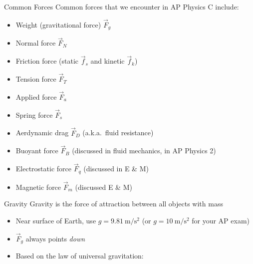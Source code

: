 \documentclass[12pt,compress,aspectratio=169]{beamer}
\begin{document}
\begin{frame}{Common Forces}
  Common forces that we encounter in AP Physics C include:
  \begin{itemize}
  \item Weight (gravitational force) $\vec F_g$
  \item Normal force $\vec F_N$
  \item Friction force (static $\vec f_s$ and kinetic $\vec f_k$)
  \item Tension force $\vec F_T$
  \item Applied force $\vec F_a$
  \item Spring force $\vec F_s$
  \item Aerdynamic drag $\vec F_D$ (a.k.a.\ fluid resistance)
  \item Buoyant force $\vec F_B$ (discussed in fluid mechanics, in AP Physics 2)
  \item Electrostatic force $\vec F_q$ (discussed in E \& M)
  \item Magnetic force $\vec F_m$ (discussed E \& M)
  \end{itemize}
\end{frame}



\begin{frame}{Gravity}
  Gravity is the force of attraction between all objects with mass
    
  \begin{itemize}
  \item Near surface of Earth, use $g=\SI{9.81}{\metre\per\second\squared}$ (or
    $g=\SI{10}{\metre\per\second\squared}$ for your AP exam)
  \item $\vec F_g$ always points \emph{down}
  \item Based on the law of universal gravitation:

  \end{itemize}    
\end{frame}
\end{document}
